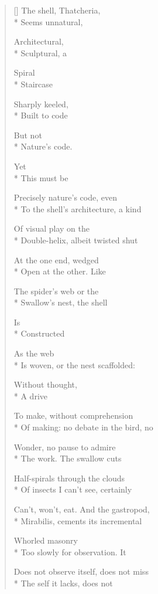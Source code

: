 \label{ch:thatcheria_mirabilis}
\settowidth{\versewidth}{Can't, won't, eat. \qquad And the gastropod,}
\begin{verse}[\versewidth]
The shell, Thatcheria,\\*
Seems unnatural,

Architectural,\\*
Sculptural, a

Spiral\\*
 \qquad Staircase

 \qquad Sharply keeled,\\*
Built to code

 \qquad But not\\*
Nature's code.

 \qquad  \qquad Yet\\*
This must be

Precisely nature's code, even\\*
To the shell's architecture, a kind

Of visual play on the\\*
Double-helix, albeit twisted shut

At the one end, wedged\\*
Open at the other. \qquad Like

The spider's web or the \\*
Swallow's nest, the shell

Is\\*
Constructed

As the web\\*
Is woven, or the nest scaffolded:

Without thought,\\*
 \qquad  \qquad A drive

To make, without comprehension\\*
Of making: no debate in the bird, no

Wonder, no pause to admire\\*
The work.  The swallow cuts

Half-spirals through the clouds\\*
Of insects I can't see, certainly

Can't, won't, eat. \qquad And the gastropod,\\*
Mirabilis, cements its incremental

Whorled masonry\\*
Too slowly for observation. \qquad It

Does not observe itself, does not miss\\*
The self it lacks, does not


\end{verse}

